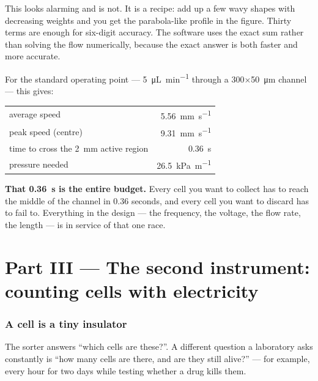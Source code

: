 \documentclass[11pt,a4paper]{article}
\begin{document}
\begin{plain}
This looks alarming and is not. It is a recipe: add up a few wavy shapes with
decreasing weights and you get the parabola-like profile in the figure. Thirty
terms are enough for six-digit accuracy. The software uses the exact sum rather
than solving the flow numerically, because the exact answer is both faster and
more accurate.
\end{plain}

For the standard operating point --- \SI{5}{\micro\liter\per\minute} through a
\SI{300}{}$\times$\SI{50}{\micro\meter} channel --- this gives:

\begin{center}\small
\begin{tabular}{lr}
\toprule
average speed & \SI{5.56}{\milli\meter\per\second} \\
peak speed (centre) & \SI{9.31}{\milli\meter\per\second} \\
time to cross the \SI{2}{\milli\meter} active region & \SI{0.36}{\second} \\
pressure needed & \SI{26.5}{\kilo\pascal\per\meter} \\
\bottomrule
\end{tabular}
\end{center}

\textbf{That \SI{0.36}{\second} is the entire budget.} Every cell you want to
collect has to reach the middle of the channel in 0.36 seconds, and every cell
you want to discard has to fail to. Everything in the design --- the frequency,
the voltage, the flow rate, the length --- is in service of that one race.

\clearpage
\part*{Part III --- The second instrument: counting cells with electricity}

\section{A cell is a tiny insulator}

The sorter answers ``which cells are these?''. A different question a laboratory
asks constantly is ``how many cells are there, and are they still alive?'' ---
for example, every hour for two days while testing whether a drug kills them.
\end{document}
